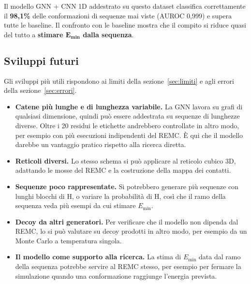 \documentclass[11pt,a4paper]{article}
\newcommand{\Emin}{E_{\min}}
\begin{document}
Il modello GNN + CNN 1D addestrato su questo dataset classifica correttamente il \textbf{98,1\%} delle conformazioni di sequenze mai viste (AUROC 0,999) e supera tutte le baseline. Il confronto con le baseline mostra che il compito si riduce quasi del tutto a \textbf{stimare $\boldsymbol{\Emin}$ dalla sequenza}.

\subsection{Sviluppi futuri}

Gli sviluppi più utili rispondono ai limiti della sezione~\ref{sec:limiti} e agli errori della sezione~\ref{sec:errori}.
\begin{itemize}
  \item \textbf{Catene più lunghe e di lunghezza variabile.} La GNN lavora su grafi di qualsiasi dimensione, quindi può essere addestrata su sequenze di lunghezze diverse. Oltre i 20 residui le etichette andrebbero controllate in altro modo, per esempio con più esecuzioni indipendenti del REMC. È qui che il modello darebbe un vantaggio pratico rispetto alla ricerca diretta.
  \item \textbf{Reticoli diversi.} Lo stesso schema si può applicare al reticolo cubico 3D, adattando le mosse del REMC e la costruzione della mappa dei contatti.
  \item \textbf{Sequenze poco rappresentate.} Si potrebbero generare più sequenze con lunghi blocchi di H, o variare la probabilità di H, così che il ramo della sequenza veda più esempi da cui stimare $\Emin$.
  \item \textbf{Decoy da altri generatori.} Per verificare che il modello non dipenda dal REMC, lo si può valutare su decoy prodotti in altro modo, per esempio da un Monte Carlo a temperatura singola.
  \item \textbf{Il modello come supporto alla ricerca.} La stima di $\Emin$ data dal ramo della sequenza potrebbe servire al REMC stesso, per esempio per fermare la simulazione quando una conformazione raggiunge l'energia prevista.
\end{itemize}
\end{document}
